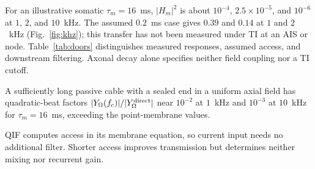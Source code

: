 \documentclass[a4paper]{article}
\begin{document}
For an illustrative somatic $\tau_m=16$~ms, $|H_m|^2$ is about
$10^{-4}$, $2.5\times10^{-5}$, and $10^{-6}$ at $1$, $2$, and $10$~kHz.
The assumed $0.2$~ms case gives $0.39$ and $0.14$ at $1$ and $2$~kHz
(Fig.~\ref{fig:khz}); this transfer has not been measured under TI at an
AIS or node. Table~\ref{tab:doors} distinguishes measured responses,
assumed access, and downstream filtering. Axonal decay alone specifies
neither field coupling nor a TI cutoff.

A sufficiently long passive cable with a sealed end in a uniform axial field
has quadratic-beat factors $|Y_\Omega(f_c)|/|Y_\Omega^{\rm direct}|$ near $10^{-2}$
at $1$~kHz and $10^{-3}$ at $10$~kHz for $\tau_m=16$~ms, exceeding the point-membrane
values.

QIF computes access in its membrane equation, so current input needs no additional
filter. Shorter access improves transmission but determines neither mixing nor
recurrent gain.
\end{document}
